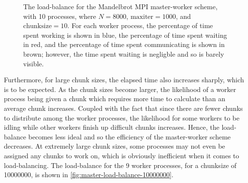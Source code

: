 \documentclass{article}
\begin{document}
\begin{figure}[h]
  \centering
  \caption{The load-balance for the Mandelbrot MPI master-worker scheme,
    with 10 processes, where $N = 8000$, $\mathrm{maxiter} = 1000$, and
    $\mathrm{chunksize} = 10$. For each worker process, the percentage of
    time spent working is shown in blue, the percentage of time spent waiting in
    red, and the percentage of time spent communicating is shown in brown;
    however, the time spent waiting is negligble and so is barely visible.}
  \label{fig:master-load-balance-10}
\end{figure}

Furthermore, for large chunk sizes, the elapsed time also increases sharply,
which is to be expected.
As the chunk sizes become larger, the likelihood of a worker process being given
a chunk which requires more time to calculate than an average chunk increases.
Coupled with the fact that since there are fewer chunks to distribute among the
worker processes, the likelihood for some workers to be idling while other
workers finish up difficult chunks increases.
Hence, the load-balance becomes less ideal and so the efficiency of the
master-worker scheme decreases.
At extremely large chunk sizes, some processes may not even be assigned any
chunks to work on, which is obviously inefficient when it comes to
load-balancing.
The load-balance for the 9 worker processes, for a chunksize of 10000000, is
shown in \autoref{fig:master-load-balance-10000000}.
\end{document}
